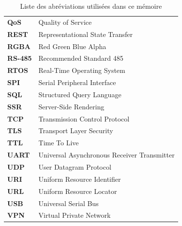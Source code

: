 \begin{table}[htbp]
\begin{tabular}{>{\bfseries}l l}
QoS & Quality of Service \\
REST & Representational State Transfer \\
RGBA & Red Green Blue Alpha \\
RS-485 & Recommended Standard 485 \\
RTOS & Real-Time Operating System \\
SPI & Serial Peripheral Interface \\
SQL & Structured Query Language \\
SSR & Server-Side Rendering \\
TCP & Transmission Control Protocol \\
TLS & Transport Layer Security \\
TTL & Time To Live \\
UART & Universal Asynchronous Receiver Transmitter \\
UDP & User Datagram Protocol \\
URI & Uniform Resource Identifier \\
URL & Uniform Resource Locator \\
USB & Universal Serial Bus \\
VPN & Virtual Private Network \\
\bottomrule
\end{tabular}
\caption{Liste des abr\'eviations utilis\'ees dans ce m\'emoire}
\label{tab:abbreviations}
\end{table}

